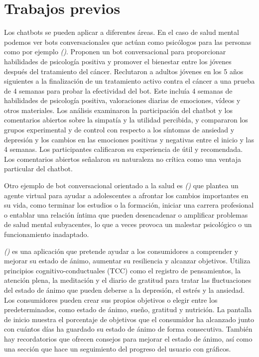 {{{\section{Trabajos previos}

Los chatbots se pueden aplicar a diferentes áreas. En el caso de salud mental podemos ver bots conversacionales que actúan como psicólogos para las personas como por ejemplo \textit{(\cite{vivibot2019})}. Proponen un bot conversacional para proporcionar habilidades de psicología positiva y promover el bienestar entre los jóvenes después del tratamiento del cáncer. Reclutaron a adultos jóvenes en los 5 años siguientes a la finalización de un tratamiento activo contra el cáncer a una prueba de 4 semanas para probar la efectividad del bot. Este incluía 4 semanas de habilidades de psicología positiva, valoraciones diarias de emociones, vídeos y otros materiales. Los análisis examinaron la participación del chatbot y los comentarios abiertos sobre la simpatía y la utilidad percibida, y compararon los grupos experimental y de control con respecto a los síntomas de ansiedad y depresión y los cambios en las emociones positivas y negativas entre el inicio y las 4 semanas. Los participantes calificaron su experiencia de útil y recomendada. Los comentarios abiertos señalaron su naturaleza no crítica como una ventaja particular del chatbot.\vspace{0.3cm}

Otro ejemplo de bot conversacional orientado a la salud es \textit{(\cite{21daystressdetox2021})} que plantea un agente virtual para ayudar a adolescentes a afrontar los cambios importantes en su vida, como terminar los estudios o la formación, iniciar una carrera profesional o entablar una relación íntima que pueden desencadenar o amplificar problemas de salud mental subyacentes, lo que a veces provoca un malestar psicológico o un funcionamiento inadaptado. \vspace{0.3cm}

\textit{(\cite{moodfit2016})} es una aplicación que pretende ayudar a los consumidores a comprender y mejorar su estado de ánimo, aumentar su resiliencia y alcanzar objetivos. Utiliza principios cognitivo-conductuales (TCC) como el registro de pensamientos, la atención plena, la meditación y el diario de gratitud para tratar las fluctuaciones del estado de ánimo que pueden deberse a la depresión, el estrés y la ansiedad. Los consumidores pueden crear sus propios objetivos o elegir entre los predeterminados, como estado de ánimo, sueño, gratitud y nutrición. La pantalla de inicio muestra el porcentaje de objetivos que el consumidor ha alcanzado junto con cuántos días ha guardado su estado de ánimo de forma consecutiva. También hay recordatorios que ofrecen consejos para mejorar el estado de ánimo, así como una sección que hace un seguimiento del progreso del usuario con gráficos.

}}}
